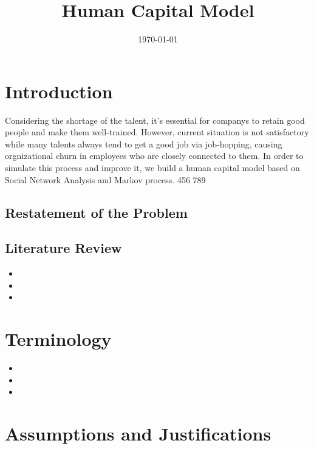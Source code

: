 \documentclass[12pt,a4paper,titlepage]{article}
\begin{document}
\title{Human Capital Model} \date{\today{}}
\maketitle

\tableofcontents

\newpage

\section{Introduction}
\label{sec:introduction}

Considering the shortage of the talent, it's essential for companys to
retain good people and make them well-trained. However, current
situation is not satisfactory while many talents always tend to get a
good job via job-hopping, causing orgnizational churn in employees who
are closely connected to them. In order to simulate this process and
improve it, we build a human capital model based on Social Network
Analysis and Markov process. 456 789

\subsection{Restatement of the Problem}
\label{sec:restatement-of-the-problem}

\subsection{Literature Review}
\label{sec:literature-review}

\begin{itemize}
\item
\item
\item
\end{itemize}

\section{Terminology}
\label{sec:terminology}

\begin{itemize}
\item
\item
\item
\end{itemize}

\section{Assumptions and Justifications}
\label{sec:assumptions-and-justifications}
\end{document}
